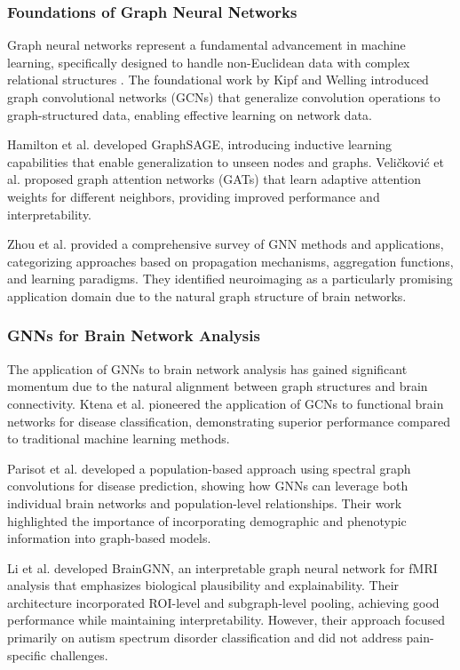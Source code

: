 \documentclass[10pt,journal,compsoc]{IEEEtran}
\begin{document}
\subsubsection{Foundations of Graph Neural Networks}

Graph neural networks represent a fundamental advancement in machine learning, specifically designed to handle non-Euclidean data with complex relational structures \cite{wu2020comprehensive}. The foundational work by Kipf and Welling \cite{kipf2016semi} introduced graph convolutional networks (GCNs) that generalize convolution operations to graph-structured data, enabling effective learning on network data.

Hamilton et al. \cite{hamilton2017inductive} developed GraphSAGE, introducing inductive learning capabilities that enable generalization to unseen nodes and graphs. Veličković et al. \cite{veličković2017graph} proposed graph attention networks (GATs) that learn adaptive attention weights for different neighbors, providing improved performance and interpretability.

Zhou et al. \cite{zhou2020graph} provided a comprehensive survey of GNN methods and applications, categorizing approaches based on propagation mechanisms, aggregation functions, and learning paradigms. They identified neuroimaging as a particularly promising application domain due to the natural graph structure of brain networks.

\subsubsection{GNNs for Brain Network Analysis}

The application of GNNs to brain network analysis has gained significant momentum due to the natural alignment between graph structures and brain connectivity. Ktena et al. \cite{ktena2018distance} pioneered the application of GCNs to functional brain networks for disease classification, demonstrating superior performance compared to traditional machine learning methods.

Parisot et al. \cite{parisot2018spectral} developed a population-based approach using spectral graph convolutions for disease prediction, showing how GNNs can leverage both individual brain networks and population-level relationships. Their work highlighted the importance of incorporating demographic and phenotypic information into graph-based models.

Li et al. \cite{li2021braingnn} developed BrainGNN, an interpretable graph neural network for fMRI analysis that emphasizes biological plausibility and explainability. Their architecture incorporated ROI-level and subgraph-level pooling, achieving good performance while maintaining interpretability. However, their approach focused primarily on autism spectrum disorder classification and did not address pain-specific challenges.
\end{document}
